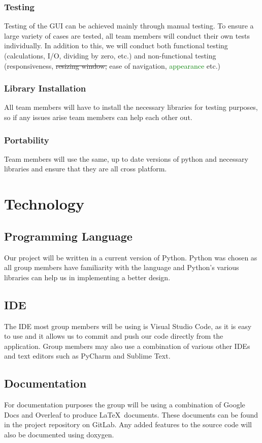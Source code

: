 \documentclass{article}
\begin{document}
\subsubsection{Testing}
Testing of the GUI can be achieved mainly through manual testing. To ensure a large variety of cases are tested, all team members will conduct their own tests individually. In addition to this, we will conduct both functional testing (calculations, I/O, dividing by zero, etc.) and non-functional testing (responsiveness, \sout{resizing window,} ease of navigation, \textcolor{Green}{appearance} etc.)   

\subsubsection{Library Installation}
All team members will have to install the necessary libraries for testing purposes, so if any issues arise team members can help each other out.

\subsubsection{Portability}
Team members will use the same, up to date versions of python and necessary libraries and ensure that they are all cross platform.

\section{Technology}
\subsection{Programming Language}
Our project will be written in a current version of Python. Python was chosen as all group members have familiarity with the language and Python’s various libraries can help us in implementing a better design.
\subsection{IDE}
The IDE most group members will be using is Visual Studio Code, as it is easy to use and it allows us to commit and push our code directly from the application. Group members may also use a combination of various other IDEs and text editors such as PyCharm and Sublime Text.
\subsection{Documentation}
For documentation purposes the group will be using a combination of Google Docs and Overleaf to produce \LaTeX\ documents. These documents can be found in the project repository on GitLab. Any added features to the source code will also be documented using doxygen.
\end{document}
